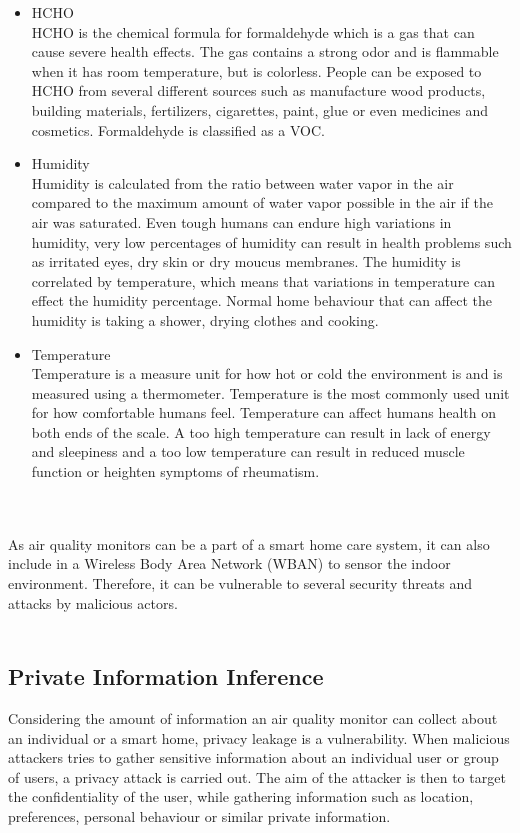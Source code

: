 \begin{itemize}
     \item HCHO\\
        HCHO is the chemical formula for formaldehyde which is a gas that can cause severe health effects. \cite{HCHO} The gas contains a strong odor and is flammable when it has room temperature, but is colorless. People can be exposed to HCHO from several different sources such as manufacture wood products, building materials, fertilizers, cigarettes, paint, glue or even medicines and cosmetics. Formaldehyde is classified as a VOC.
    \item Humidity\\
        Humidity is calculated from the ratio between water vapor in the air compared to the maximum amount of water vapor possible in the air if the air was saturated. \cite{RecommendedIAQ} Even tough humans can endure high variations in humidity, very low percentages of humidity can result in health problems such as irritated eyes, dry skin or dry moucus membranes. The humidity is correlated by temperature, which means that variations in temperature can effect the humidity percentage. Normal home behaviour that can affect the humidity is taking a shower, drying clothes and cooking. 
    \item Temperature\\
        Temperature is a measure unit for how hot or cold the environment is and is measured using a thermometer. Temperature is the most commonly used unit for how comfortable humans feel. Temperature can affect humans health on both ends of the scale. A too high temperature can result in lack of energy and sleepiness and a too low temperature can result in reduced muscle function or heighten symptoms of rheumatism. \cite{Temp}
\end{itemize}


\\\\
As air quality monitors can be a part of a smart home care system, it can also include in a Wireless Body Area Network (WBAN) to sensor the indoor environment. Therefore, it can be vulnerable to several security threats and attacks by malicious actors. \cite{AttackstoAQMs} 
\\\\

\subsection{Private Information Inference}
Considering the amount of information an air quality monitor can collect about an individual or a smart home, privacy leakage is a vulnerability. \cite{SecPrivSmartCity} When malicious attackers tries to gather sensitive information about an individual user or group of users, a privacy attack is carried out. \cite{CyberEntitySecInIoT} The aim of the attacker is then to target the confidentiality of the user, while gathering information such as location, preferences, personal behaviour or similar private information.

